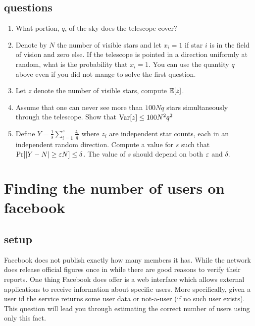 \documentclass{article}
\begin{document}
\subsection*{questions}
\begin{enumerate}
\item What portion, $q$, of the sky does the telescope cover?
\item Denote by $N$ the number of visible stars and let $x_i = 1$ if star $i$ is in the field of vision and zero else. 
If the telescope is pointed in a direction uniformly at random, what is the probability that $x_i = 1$.
You can use the quantity $q$ above even if you did not mange to solve the first question.
\item Let $z$ denote the number of visible stars, compute ${\mathbb E}[z]$.
\item Assume that one can never see more than $100Nq$ stars simultaneously through the telescope.
Show that ${\operatorname{Var}}[z] \le 100N^2q^2$
\item Define $Y = \frac{1}{s}\sum_{i=1}^{s}\frac{z_i}{q}$ where $z_i$ are independent star counts, each in an independent random direction. 
Compute a value for $s$ such that $\Pr[|Y - N| \ge \varepsilon N] \le \delta$.
The value of $s$ should depend on both $\varepsilon$ and $\delta$.
\end{enumerate}

\pagebreak




\section{Finding the number of users on facebook}
\subsection*{setup}
Facebook does not publish exactly how many members it has. 
While the network does release official figures once in while there are good reasons to verify their reports.
One thing Facebook does offer is a web interface which allows external applications to receive information about specific users.
More specifically, given a user id the service returns some user data or not-a-user (if no such user exists).
This question will lead you through estimating the correct number of users using only this fact.
\end{document}
